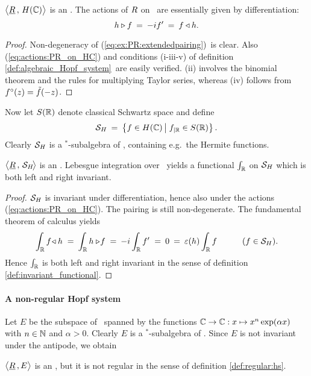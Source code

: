 \begin{ex} \label{ex:familiar:hopfR}
$\pairM{\underline{\HopfR}\,}{\HC}$ is an \ahss\@.
The actions of\/ $R$ on\/ \HC\ are essentially given by differentiation:
\begin{equation}\label{eq:actions:PR_on_HC}
  h \triangleright f \:=\:  -i f'  \:=\:  f \triangleleft h.
\end{equation}
\end{ex}

\begin{proof}
Non-degeneracy of (\ref{eq:ex:PR:extendedpairing})\ is clear.
Also (\ref{eq:actions:PR_on_HC}) and conditions (i-iii-v) of
definition \ref{def:algebraic_Hopf_system}\ are easily verified.
(ii) involves the binomial theorem and the rules for multiplying Taylor series,
whereas (iv) follows from $f^\circ(z)=\tilde{f}(-z)$.
\end{proof}
\vspace{2ex}

Now let $S(\mathbb{R})$ denote classical Schwartz space and define
$$ \SH \:=\: \left\{ f\in \HC \left|\vertM \right.
                               f_{|\RR}  \in S(\RR) \right\}.$$
Clearly ${\mathcal S}_H$ is a $^*$-subalgebra of \HC, containing e.g.\ the Hermite functions.


\begin{ex} \label{ex:familiar:Schwartz}
$\pairM{\underline{\HopfR}\,}{\SH\!}$ is an \ahss\@.
Lebesgue integration over\/ \RR\ yields a functional\/ $\int_{\mathbb{R}}$ on\/ ${\mathcal S}_H$ which is both
left and right invariant.
\end{ex}

\begin{proof}
${\mathcal S}_H$ is invariant under differentiation, hence also under the actions
(\ref{eq:actions:PR_on_HC}). The pairing is still non-degenerate.
The fundamental theorem of calculus yields
$$  \int_{\mathbb{R}} f \! \triangleleft h
         \;=\:  \int_{\mathbb{R}} h \triangleright \! f
         \;=\:  -i \int_{\mathbb{R}} f'
         \;=\:  0
         \:=\:  \varepsilon(h) \int_{\mathbb{R}} f   \hspace{3em} (f\in{\mathcal S}_H). $$
Hence $\int_{\mathbb{R}}$ is both left and right invariant in the sense of
definition \ref{def:invariant_functional}.
\end{proof}
\vspace{2ex}


\paragraph{A non-regular Hopf system}
Let $E$ be the subspace of \HC\ spanned by the functions
$\mathbb{C} \rightarrow \mathbb{C} : x \mapsto  x^n \exp(\alpha x)$ with $n\in \mathbb{N}$ and $\alpha > 0$.
Clearly $E$ is a $^*$-subalgebra of \HC\@.
Since $E$ is not invariant under the antipode, we obtain


\begin{ex} \label{ex:non_regular_Hopf_system}
$\pairM{\underline{\HopfR}\,}{\!E}$ is an \ahs, but it is not regular
in the sense of definition \ref{def:regular:hs}\@.
\end{ex}
